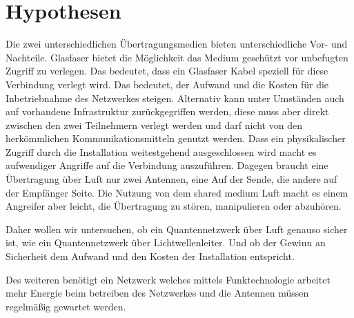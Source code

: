 \chapter{Hypothesen}

Die zwei unterschiedlichen Übertragungsmedien bieten unterschiedliche Vor- und Nachteile.
Glasfaser bietet die Möglichkeit das Medium geschützt vor unbefugten Zugriff zu verlegen.
Das bedeutet, dass ein Glasfaser Kabel speziell für diese Verbindung verlegt wird.
Das bedeutet, der Aufwand und die Kosten für die Inbetriebnahme des Netzwerkes steigen.
Alternativ kann unter Umständen auch auf vorhandene Infrastruktur zurückgegriffen werden, diese muss aber direkt zwischen den zwei Teilnehmern verlegt werden und darf nicht von den herkömmlichen Kommunikationsmitteln genutzt werden.
Dass ein physikalischer Zugriff durch die Installation weitestgehend ausgeschlossen wird macht es aufwendiger Angriffe auf die Verbindung auszuführen.
Dagegen braucht eine Übertragung über Luft nur zwei Antennen, eine Auf der Sende, die andere auf der Empfänger Seite.
Die Nutzung von dem shared medium Luft macht es einem Angreifer aber leicht, die Übertragung zu stören, manipulieren oder abzuhören.

Daher wollen wir untersuchen, ob ein Quantennetzwerk über Luft genauso sicher ist, wie ein Quantennetzwerk über Lichtwellenleiter.
Und ob der Gewinn an Sicherheit dem Aufwand und den Kosten der Installation entspricht.

Des weiteren benötigt ein Netzwerk welches mittels Funktechnologie arbeitet mehr Energie beim betreiben des Netzwerkes und die Antennen müssen regelmäßig gewartet werden.
